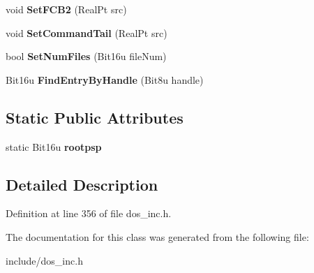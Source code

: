 \begin{DoxyCompactItemize}
\item 
\hypertarget{classDOS__PSP_a4c0066046f23c2d51f36da5f31749299}{void {\bfseries Set\-F\-C\-B2} (Real\-Pt src)}\label{classDOS__PSP_a4c0066046f23c2d51f36da5f31749299}

\item 
\hypertarget{classDOS__PSP_a513c55126b7b22f3fa587f005cbade46}{void {\bfseries Set\-Command\-Tail} (Real\-Pt src)}\label{classDOS__PSP_a513c55126b7b22f3fa587f005cbade46}

\item 
\hypertarget{classDOS__PSP_ac5a10428bbb82e178e67350935882c76}{bool {\bfseries Set\-Num\-Files} (Bit16u file\-Num)}\label{classDOS__PSP_ac5a10428bbb82e178e67350935882c76}

\item 
\hypertarget{classDOS__PSP_a94aa51f3b9eef379d2fbcaf025206a86}{Bit16u {\bfseries Find\-Entry\-By\-Handle} (Bit8u handle)}\label{classDOS__PSP_a94aa51f3b9eef379d2fbcaf025206a86}

\end{DoxyCompactItemize}
\subsection*{Static Public Attributes}
\begin{DoxyCompactItemize}
\item 
\hypertarget{classDOS__PSP_ad46b74f756dae06941329a205ab482fd}{static Bit16u {\bfseries rootpsp}}\label{classDOS__PSP_ad46b74f756dae06941329a205ab482fd}

\end{DoxyCompactItemize}


\subsection{Detailed Description}


Definition at line 356 of file dos\-\_\-inc.\-h.



The documentation for this class was generated from the following file\-:\begin{DoxyCompactItemize}
\item 
include/dos\-\_\-inc.\-h\end{DoxyCompactItemize}
